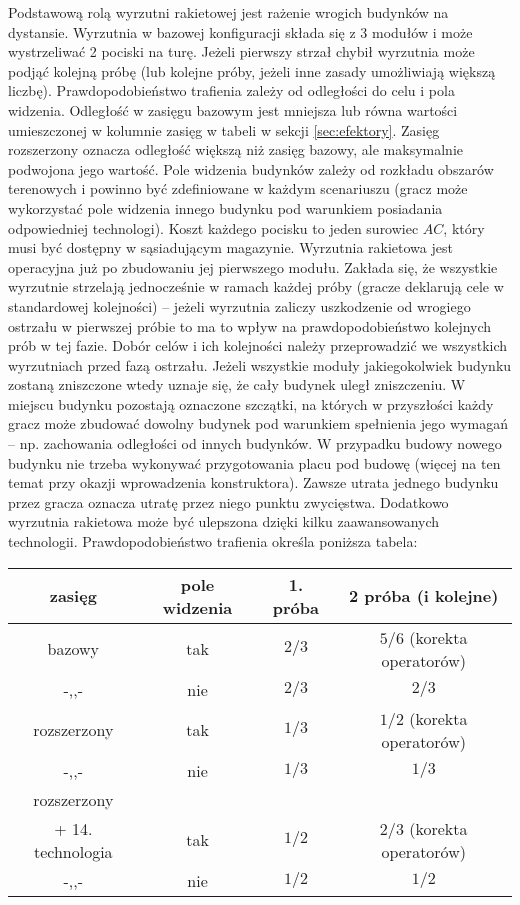 \documentclass[11pt,a4paper]{article}
\begin{document}
Podstawową rolą wyrzutni rakietowej jest rażenie wrogich budynków na dystansie. Wyrzutnia w bazowej konfiguracji składa się z 3 modułów i może wystrzeliwać 2 pociski na turę. Jeżeli pierwszy strzał chybił wyrzutnia może podjąć kolejną próbę (lub kolejne próby, jeżeli inne zasady umożliwiają większą liczbę). Prawdopodobieństwo trafienia zależy od odległości do celu i pola widzenia. Odległość w zasięgu bazowym jest mniejsza lub równa wartości umieszczonej w kolumnie zasięg w tabeli w sekcji \ref{sec:efektory}. Zasięg rozszerzony oznacza odległość większą niż zasięg bazowy, ale maksymalnie podwojona jego wartość. Pole widzenia budynków zależy od rozkładu obszarów terenowych i powinno być zdefiniowane w każdym scenariuszu (gracz może wykorzystać pole widzenia innego budynku pod warunkiem posiadania odpowiedniej technologi). Koszt każdego pocisku to jeden surowiec $AC$, który musi być dostępny w sąsiadującym magazynie. Wyrzutnia rakietowa jest operacyjna już po zbudowaniu jej pierwszego modułu. Zakłada się, że wszystkie wyrzutnie strzelają jednocześnie w ramach każdej próby (gracze deklarują cele w standardowej kolejności) -- jeżeli wyrzutnia zaliczy uszkodzenie od wrogiego ostrzału w pierwszej próbie to ma to wpływ na prawdopodobieństwo kolejnych prób w tej fazie. Dobór celów i ich kolejności należy przeprowadzić we wszystkich wyrzutniach przed fazą ostrzału. Jeżeli wszystkie moduły jakiegokolwiek budynku zostaną zniszczone wtedy uznaje się, że cały budynek uległ zniszczeniu. W miejscu budynku pozostają oznaczone szczątki, na których w przyszłości każdy gracz może zbudować dowolny budynek pod warunkiem spełnienia jego wymagań -- np. zachowania odległości od innych budynków. W przypadku budowy nowego budynku nie trzeba wykonywać przygotowania placu pod budowę (więcej na ten temat przy okazji wprowadzenia konstruktora). Zawsze utrata jednego budynku przez gracza oznacza utratę przez niego punktu zwycięstwa. Dodatkowo wyrzutnia rakietowa może być ulepszona dzięki kilku zaawansowanych technologii. Prawdopodobieństwo trafienia określa poniższa tabela:
\begin{center}
\begin{tabular}{| c | c | c | c |}
  \hline
   \textbf{zasięg} & \textbf{pole widzenia} & \textbf{1. próba} & \textbf{2 próba} (i kolejne) \\
  \hline
  bazowy & tak   & $2/3$ & $5/6$ (korekta operatorów) \\  
  \hline
  -,,- & nie   & $2/3$ & $2/3$ \\  
  \hline
  rozszerzony & tak & $1/3$ & $1/2$ (korekta operatorów) \\  
  \hline
  -,,- & nie  & $1/3$ & $1/3$ \\  
  \hline
  rozszerzony  &  &  &  \\  
  + 14. technologia & tak  & $1/2$ & $2/3$ (korekta operatorów) \\  
  \hline
  -,,- & nie   & $1/2$ & $1/2$ \\  
  \hline
\end{tabular}
\end{center}
\end{document}
